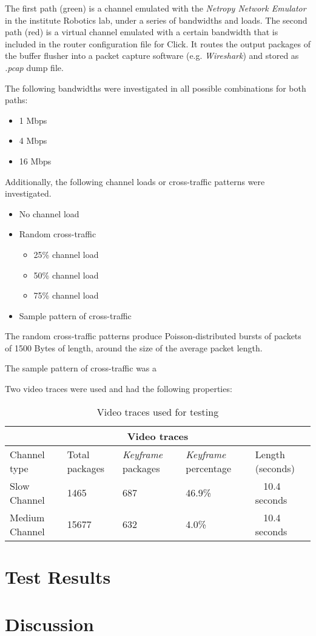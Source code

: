 The first path (\textcolor{cadmiumgreen}{green}) is a channel emulated with the \textit{Netropy Network Emulator} in the institute Robotics lab, under a series of bandwidths and loads. The second path (\textcolor{amaranth}{red}) is a virtual channel emulated with a certain bandwidth that is included in the router configuration file for Click. It routes the output packages of the buffer flusher into a packet capture software (e.g. \textit{Wireshark}) and stored as \textit{.pcap} dump file.

The following bandwidths were investigated in all possible combinations for both paths:

\begin{itemize}
\item{1 Mbps}
\item{4 Mbps}
\item{16 Mbps}
\end{itemize}

Additionally, the following channel loads or cross-traffic patterns were investigated.

\begin{itemize}
	\item{No channel load}
	\item{Random cross-traffic}
		\begin{itemize}
			\item{25\% channel load}
			\item{50\% channel load}
			\item{75\% channel load}
		\end{itemize}
	\item{Sample pattern of cross-traffic}
\end{itemize}

The random cross-traffic patterns produce Poisson-distributed bursts of packets of 1500 Bytes of length, around the size of the average packet length. 

The sample pattern of cross-traffic was a 

Two video traces were used and had the following properties:

\begin{table}[htbp]
\caption{Video traces used for testing}
\break
\setlength{\arrayrulewidth}{1mm}
\setlength{\tabcolsep}{12pt}
\renewcommand{\arraystretch}{1.5}
 {
\begin{tabular}{ |p{2cm}|p{2cm}|p{2cm}|p{2cm}|p{4cm}|  }
\hline
\multicolumn{5}{|c|}{Video traces} \\
\hline
Channel type & Total packages & \textit{Keyframe} packages & \textit{Keyframe} percentage & Length (seconds) \\
\hline
Slow Channel & 1465 & 687 & 46.9\% & ~ 10.4 seconds \\
Medium Channel & 15677 & 632 & 4.0\% & ~ 10.4 seconds\\

\hline
\end{tabular}
}
\end{table}




\section{Test Results}

\section{Discussion}